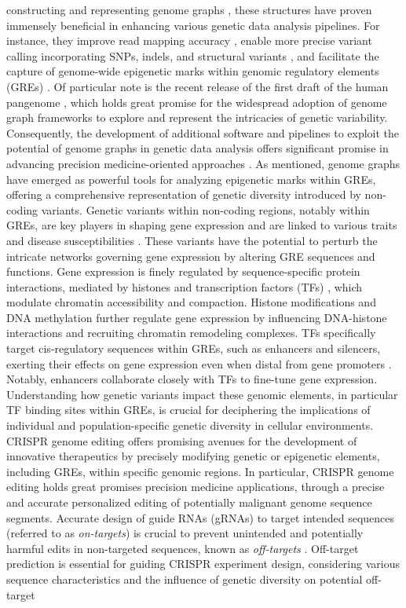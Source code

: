 \documentclass[a4paper, titlepage, openright]{book}
\begin{document}
constructing and representing genome graphs \citep{andreace2023comparing}, these structures have proven immensely beneficial in enhancing various genetic data analysis pipelines. For instance, they improve read mapping accuracy \citep{sibbesen2023haplotype}, enable more precise variant calling incorporating SNPs, indels, and structural variants \citep{garrison2018variation,ebler2022pangenome}, and facilitate the capture of genome-wide epigenetic marks within genomic regulatory elements (GREs) \citep{groza2020personalized,liao2023draft}. Of particular note is the recent release of the first draft of the human pangenome \citep{liao2023draft}, which holds great promise for the widespread adoption of genome graph frameworks to explore and represent the intricacies of genetic variability. Consequently, the development of additional software and pipelines to exploit the potential of genome graphs in genetic data analysis offers significant promise in advancing precision medicine-oriented approaches \citep{yu2023human}. As mentioned, genome graphs have emerged as powerful tools for analyzing epigenetic marks within GREs, offering a comprehensive representation of genetic diversity introduced by non-coding variants. Genetic variants within non-coding regions, notably within GREs, are key players in shaping gene expression and are linked to various traits and disease susceptibilities \citep{weinhold2014genome,wienert2015editing}. These variants have the potential to perturb the intricate networks governing gene expression by altering GRE sequences and functions. Gene expression is finely regulated by sequence-specific protein interactions, mediated by histones and transcription factors (TFs) \citep{lambert2018human}, which modulate chromatin accessibility and compaction. Histone modifications and DNA methylation further regulate gene expression by influencing DNA-histone interactions and recruiting chromatin remodeling complexes. TFs specifically target cis-regulatory sequences within GREs, such as enhancers and silencers, exerting their effects on gene expression even when distal from gene promoters \citep{lambert2018human}. Notably, enhancers collaborate closely with TFs to fine-tune gene expression. Understanding how genetic variants impact these genomic elements, in particular TF binding sites within GREs, is crucial for deciphering the implications of individual and population-specific genetic diversity in cellular environments. CRISPR genome editing \citep{cong2013multiplex} offers promising avenues for the development of innovative therapeutics by precisely modifying genetic or epigenetic elements, including GREs, within specific genomic regions. In particular, CRISPR genome editing holds great promises precision medicine applications, through a precise and accurate personalized editing of potentially malignant genome sequence segments. Accurate design of guide RNAs (gRNAs) to target intended sequences (referred to as \emph{on-targets}) is crucial to prevent unintended and potentially harmful edits in non-targeted sequences, known as \emph{off-targets} \citep{pattanayak2013high,cho2014analysis}. Off-target prediction is essential for guiding CRISPR experiment design, considering various sequence characteristics and the influence of genetic diversity on potential off-target 
\end{document}
